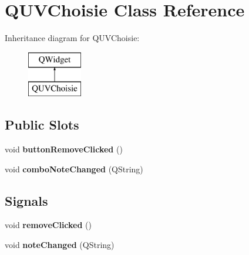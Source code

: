 \hypertarget{classQUVChoisie}{\section{Q\+U\+V\+Choisie Class Reference}
\label{classQUVChoisie}
}
Inheritance diagram for Q\+U\+V\+Choisie\+:\begin{figure}[H]
\begin{center}
\leavevmode
\includegraphics[height=2.000000cm]{classQUVChoisie}
\end{center}
\end{figure}
\subsection*{Public Slots}
\begin{DoxyCompactItemize}
\item 
\hypertarget{classQUVChoisie_a1bc7d18797b56c312082bb42b9350347}{void {\bfseries button\+Remove\+Clicked} ()}\label{classQUVChoisie_a1bc7d18797b56c312082bb42b9350347}

\item 
\hypertarget{classQUVChoisie_a04be97b4d99c43f5104762b3734894de}{void {\bfseries combo\+Note\+Changed} (Q\+String)}\label{classQUVChoisie_a04be97b4d99c43f5104762b3734894de}

\end{DoxyCompactItemize}
\subsection*{Signals}
\begin{DoxyCompactItemize}
\item 
\hypertarget{classQUVChoisie_aab80ca6e42ae0ee0e1404b1aab4cf758}{void {\bfseries remove\+Clicked} ()}\label{classQUVChoisie_aab80ca6e42ae0ee0e1404b1aab4cf758}

\item 
\hypertarget{classQUVChoisie_add5b9f406168959c0977dad304f4fcc2}{void {\bfseries note\+Changed} (Q\+String)}\label{classQUVChoisie_add5b9f406168959c0977dad304f4fcc2}

\end{DoxyCompactItemize}
